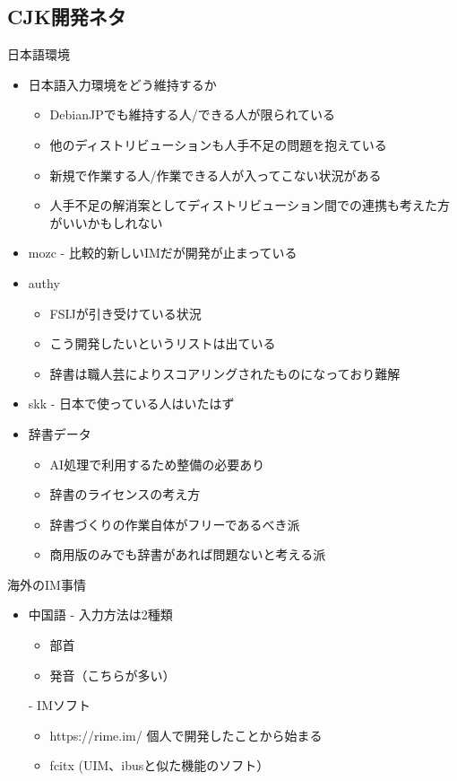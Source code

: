 \documentclass[mingoth,a4paper]{jsarticle}
\begin{document}
\subsection{CJK開発ネタ}
日本語環境
\begin{itemize}
\item 日本語入力環境をどう維持するか
    \begin{itemize}
    \item DebianJPでも維持する人/できる人が限られている
    \item 他のディストリビューションも人手不足の問題を抱えている
    \item 新規で作業する人/作業できる人が入ってこない状況がある
    \item 人手不足の解消案としてディストリビューション間での連携も考えた方がいいかもしれない
    \end{itemize}
\item mozc
    - 比較的新しいIMだが開発が止まっている
\item authy
    \begin{itemize}
    \item FSIJが引き受けている状況
    \item こう開発したいというリストは出ている
    \item 辞書は職人芸によりスコアリングされたものになっており難解
    \end{itemize}
\item skk
    - 日本で使っている人はいたはず
\item 辞書データ
    \begin{itemize}
    \item AI処理で利用するため整備の必要あり
    \item 辞書のライセンスの考え方
    \item 辞書づくりの作業自体がフリーであるべき派
    \item 商用版のみでも辞書があれば問題ないと考える派
    \end{itemize}
\end{itemize}
海外のIM事情
\begin{itemize}
\item 中国語
    - 入力方法は2種類
    \begin{itemize}
    \item 部首
    \item 発音（こちらが多い）
    \end{itemize}
    - IMソフト
    \begin{itemize}
      \item https://rime.im/  個人で開発したことから始まる
      \item fcitx (UIM、ibusと似た機能のソフト）
    \end{itemize}
\end{itemize}
\end{document}

